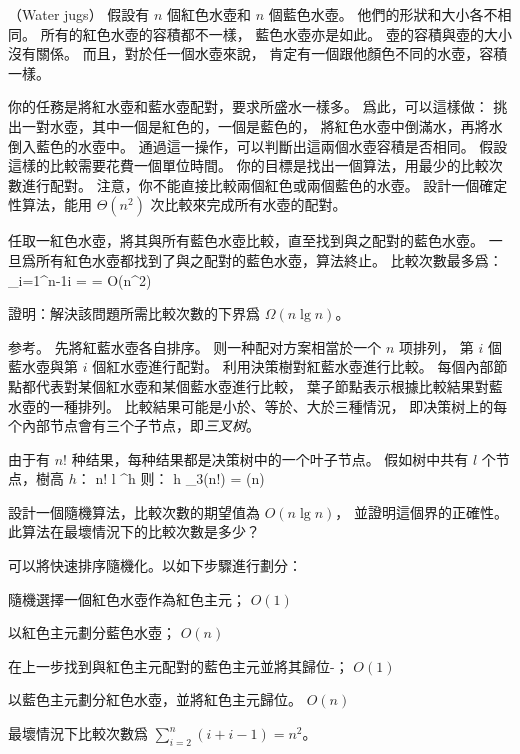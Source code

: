 \startPROBLEM
（Water jugs）
假設有 $n$ 個紅色水壺和 $n$ 個藍色水壺。
他們的形狀和大小各不相同。
所有的紅色水壺的容積都不一樣，
藍色水壺亦是如此。
壺的容積與壺的大小沒有關係。
而且，對於任一個水壺來說，
肯定有一個跟他顏色不同的水壺，容積一樣。

你的任務是將紅水壺和藍水壺配對，要求所盛水一樣多。
爲此，可以這樣做：
挑出一對水壺，其中一個是紅色的，一個是藍色的，
將紅色水壺中倒滿水，再將水倒入藍色的水壺中。
通過這一操作，可以判斷出這兩個水壺容積是否相同。
假設這樣的比較需要花費一個單位時間。
你的目標是找出一個算法，用最少的比較次數進行配對。
注意，你不能直接比較兩個紅色或兩個藍色的水壺。
\startigBase[a]\startitem
設計一個確定性算法，能用 $\Theta(n^2)$ 次比較來完成所有水壺的配對。
\stopitem\stopigBase

\startANSWER
任取一紅色水壺，將其與所有藍色水壺比較，直至找到與之配對的藍色水壺。
一旦爲所有紅色水壺都找到了與之配對的藍色水壺，算法終止。
比較次數最多爲：
\startformula
\sum_{i=1}^{n-1}i =  = O(n^2)
\stopformula
\stopANSWER

\startigBase[a,continue]\startitem
證明：解決該問題所需比較次數的下界爲 $\Omega(n\lg{n})$。
\stopitem\stopigBase

\startANSWER
参考。
先將紅藍水壺各自排序。
则一种配对方案相當於一个 $n$ 项排列，
第 $i$ 個藍水壺與第 $i$ 個紅水壺進行配對。
利用決策樹對紅藍水壺進行比較。
每個內部節點都代表對某個紅水壺和某個藍水壺進行比較，
葉子節點表示根據比較結果對藍水壺的一種排列。
比較結果可能是小於、等於、大於三種情況，
即决策树上的每个內部节点會有三个子节点，即\emph{三叉树}。

由于有 $n!$ 种结果，每种结果都是决策树中的一个叶子节点。
假如树中共有 $l$ 个节点，樹高 $h$：
\startformula
n! \le l ^h
\stopformula
则：
\startformula
h \ge \lg_{3}(n!) = \Omega(n)
\stopformula
\stopANSWER

\startigBase[a,continue]\startitem
設計一個隨機算法，比較次數的期望值為 $O(n\lg{n})$，
並證明這個界的正確性。
此算法在最壞情況下的比較次數是多少？
\stopitem\stopigBase

\startANSWER
可以將快速排序隨機化。以如下步驟進行劃分：
\startigBase[n]
\item 隨機選擇一個紅色水壺作為紅色主元； $O(1)$
\item 以紅色主元劃分藍色水壺； $O(n)$
\item 在上一步找到與紅色主元配對的藍色主元並將其歸位-； $O(1)$
\item 以藍色主元劃分紅色水壺，並將紅色主元歸位。 $O(n)$
\stopigBase

最壞情況下比較次數爲 $\sum_{i=2}^{n}(i+i-1) = n^2$。
\stopANSWER

\stopPROBLEM
